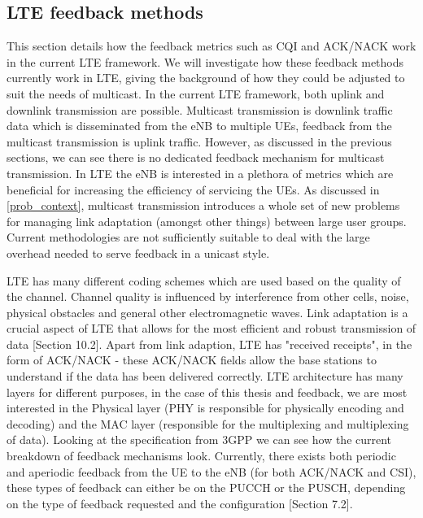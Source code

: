\documentclass{article}
\begin{document}
\subsection{LTE feedback methods}\label{lte_feedback_current}

This section details how the feedback metrics such as \ac{CQI} and ACK/NACK work in the current LTE framework. We will investigate how these feedback methods currently work in LTE, giving the background of how they could be adjusted to suit the needs of multicast. In the current LTE framework, both uplink and downlink transmission are possible. Multicast transmission is downlink traffic data which is disseminated from the eNB to multiple UEs, feedback from the multicast transmission is uplink traffic. However, as discussed in the previous sections, we can see there is no dedicated feedback mechanism for multicast transmission. In LTE the eNB is interested in a plethora of metrics which are beneficial for increasing the efficiency of servicing the UEs. As discussed in \cref{prob_context}, multicast transmission introduces a whole set of new problems for managing link adaptation (amongst other things) between large user groups. Current methodologies are not sufficiently suitable to deal with the large overhead needed to serve feedback in a unicast style.

LTE has many different coding schemes which are used based on the quality of the channel. Channel quality is influenced by interference from other cells, noise,  physical obstacles and general other electromagnetic waves.  Link adaptation is a crucial aspect of LTE that allows for the most efficient and robust transmission of data \cite{umts_sesia}[Section 10.2]. Apart from link adaption, LTE has "received receipts", in the form of ACK/NACK - these ACK/NACK fields allow the base stations to understand if the data has been delivered correctly. LTE architecture has many layers for different purposes, in the case of this thesis and feedback, we are most interested in the Physical layer (PHY is responsible for physically encoding and decoding) and the MAC layer (responsible for the multiplexing and multiplexing of data). Looking at the specification from 3GPP we can see how the current breakdown of feedback mechanisms look. Currently, there exists both periodic and aperiodic feedback from the UE to the eNB (for both ACK/NACK and CSI), these types of feedback can either be on the PUCCH or the PUSCH, depending on the type of feedback requested and the configuration \cite{ETSITS136213}[Section 7.2]. 
\end{document}
